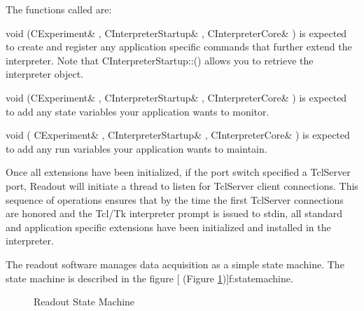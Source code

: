       
      The functions called are:
      \begin{description}
	 \item{void (CExperiment\&           ,
								     CInterpreterStartup\& ,
								     CInterpreterCore\&     )}
	     is expected to create and register
	    any application specific commands that further extend the interpreter.
	    Note that CInterpreterStartup::() allows you to
	    retrieve the interpreter object.
	 \item{void (CExperiment\&       ,
								     CInterpreterStartup\& ,
								     CInterpreterCore\&     )}
	    is expected to add any state
	   variables your application wants to monitor.
	 \item{void ( CExperiment\&           ,
								     CInterpreterStartup\& ,
								     CInterpreterCore\&     )}
	     is expected to add any run
	    variables your application wants to maintain.
      \end{description}
      
      Once all extensions have been initialized, if the {\dash\dash}port 
      switch specified a TclServer port, Readout will initiate a thread
      to listen for TclServer client connections.  This sequence of operations
      ensures that by the time the first TclServer connections are honored
      and the Tcl/Tk interpreter prompt is issued to stdin, all standard and
      application specific extensions have been initialized and installed in 
      the interpreter.
      
      
   
   The readout software manages data acquisition as a simple state machine. 
   The state machine is described in the figure 
   [
      (Figure \ref{f:statemachine})]{f:statemachine}.
   
        \begin{figure}[htb]
	 \caption{Readout State Machine}\label{f:statemachine}
      \end{figure}
  
